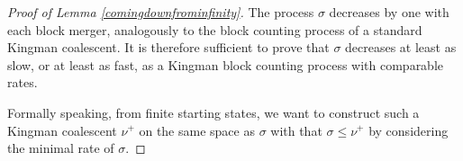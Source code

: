 \documentclass[12pt, leqno]{article}
\newtheorem{lemma}{Lemma}
\begin{document}
\begin{proof}[Proof of Lemma \ref{comingdownfrominfinity}]
The process $\sigma$ decreases by one with each block merger, analogously to the block counting process of a standard Kingman coalescent. It is therefore sufficient to prove that $\sigma$ decreases at least as slow, or at least as fast, as a Kingman block counting process with comparable rates.


\medskip

 Formally speaking, from finite starting states, we want to construct such a Kingman coalescent $\nu^+$ on the same space as $\sigma$ with that $\sigma\leq \nu^{+}$ by considering the minimal  rate of $\sigma$. %

\medskip


\end{proof}
\end{document}
